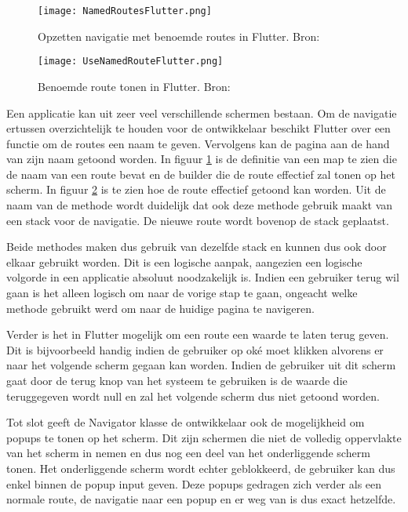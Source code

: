 \begin{figure}
    \texttt{[image: NamedRoutesFlutter.png]}
    \caption{Opzetten navigatie met benoemde routes in Flutter. Bron: \textcite{Flutter.dev2020}}
    \label{fig:namedRoutesFlutter}
\end{figure}

\begin{figure}
    \texttt{[image: UseNamedRouteFlutter.png]}
    \caption{Benoemde route tonen in Flutter. Bron: \textcite{Flutter.dev2020}}
    \label{fig:useNamedRoutesFlutter}
\end{figure}

Een applicatie kan uit zeer veel verschillende schermen bestaan. Om de navigatie ertussen overzichtelijk te houden voor de ontwikkelaar beschikt Flutter over een functie om de routes een naam te geven. Vervolgens kan de pagina aan de hand van zijn naam getoond worden. In figuur \ref{fig:namedRoutesFlutter} is de definitie van een map te zien die de naam van een route bevat en de builder die de route effectief zal tonen op het scherm. In figuur \ref{fig:useNamedRoutesFlutter} is te zien hoe de route effectief getoond kan worden. Uit de naam van de methode wordt duidelijk dat ook deze methode gebruik maakt van een stack voor de navigatie. De nieuwe route wordt bovenop de stack geplaatst.

Beide methodes maken dus gebruik van dezelfde stack en kunnen dus ook door elkaar gebruikt worden. Dit is een logische aanpak, aangezien een logische volgorde in een applicatie absoluut noodzakelijk is. Indien een gebruiker terug wil gaan is het alleen logisch om naar de vorige stap te gaan, ongeacht welke methode gebruikt werd om naar de huidige pagina te navigeren. 

Verder is het in Flutter mogelijk om een route een waarde te laten terug geven. Dit is bijvoorbeeld handig indien de gebruiker op oké moet klikken alvorens er naar het volgende scherm gegaan kan worden. Indien de gebruiker uit dit scherm gaat door de terug knop van het systeem te gebruiken is de waarde die teruggegeven wordt null en zal het volgende scherm dus niet getoond worden.

Tot slot geeft de Navigator klasse de ontwikkelaar ook de mogelijkheid om popups te tonen op het scherm. Dit zijn schermen die niet de volledig oppervlakte van het scherm in nemen en dus nog een deel van het onderliggende scherm tonen. Het onderliggende scherm wordt echter geblokkeerd, de gebruiker kan dus enkel binnen de popup input geven. Deze popups gedragen zich verder als een normale route, de navigatie naar een popup en er weg van is dus exact hetzelfde.


